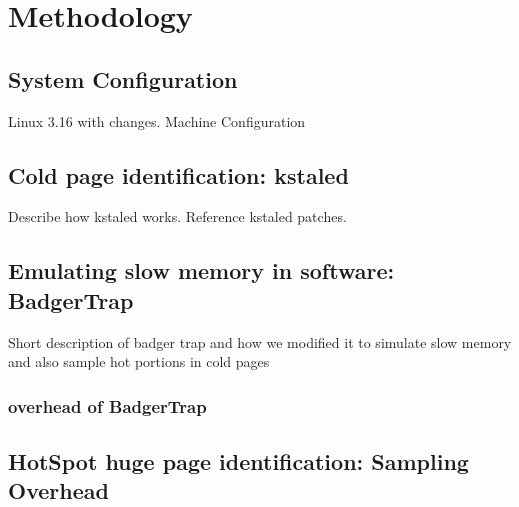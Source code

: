 \section{Methodology}
\label{methodology}

\subsection{System Configuration}
Linux 3.16 with changes.
Machine Configuration
\subsection{Cold page identification: kstaled}
Describe how kstaled works. Reference kstaled patches.

\subsection{Emulating slow memory in software: BadgerTrap}
Short description of badger trap and how we modified it to simulate slow memory
and also sample hot portions in cold pages

\subsubsection{overhead of BadgerTrap}

\subsection{HotSpot huge page identification: Sampling Overhead}
